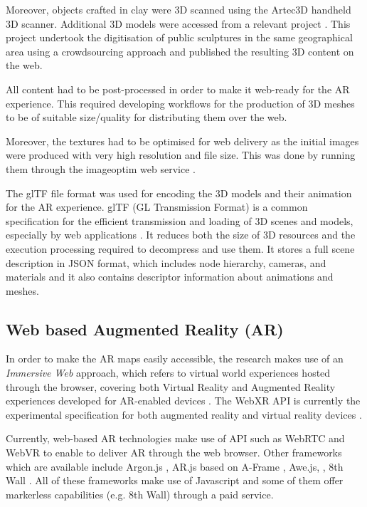 \documentclass[acmlarge,screen,dvipsnames]{acmart}
\begin{document}
Moreover, objects crafted in clay were 3D scanned using the Artec3D handheld
3D scanner. Additional 3D models were accessed from a relevant project
\cite{14f05b94a1844f5e850c87fc9d042c59}. This project undertook the
digitisation of public sculptures in the same geographical area using a
crowdsourcing approach and published the resulting 3D content on the web.

All content had to be post-processed in order to make it web-ready for the AR
experience. This required developing workflows for the production of 3D meshes
to be of suitable size/quality for distributing them over the web. 

Moreover, the textures had to be optimised for web delivery as the initial images were
produced with very high resolution and file size. This was done by running
them through the imageoptim web service \cite{ImageOptim}.  

The glTF file format was used for encoding the 3D models and their animation
for the AR experience. glTF (GL Transmission Format) is a common specification
for the efficient transmission and loading of 3D scenes and models, especially
by web applications \cite{khronos}. It reduces both the size of 3D resources
and the execution processing required to decompress and use them. It stores a
full scene description in JSON format, which includes node hierarchy, cameras,
and materials and it also contains descriptor information about animations and
meshes.


\subsection{Web based Augmented Reality (AR)} %

In order to make the AR maps easily
accessible, the research makes use of an \emph{Immersive Web} approach, which
refers to virtual world experiences hosted through the browser, covering both
Virtual Reality and Augmented Reality experiences developed for AR-enabled
devices \cite{imweb}. The WebXR API is currently the experimental
specification for both augmented reality and virtual reality devices
\cite{webxr}.

Currently, web-based AR technologies make use of API such as WebRTC and WebVR
to enable to deliver AR through the web browser. Other frameworks which are
available include Argon.js \cite{Argon.js}, AR.js based on A-Frame
\cite{aframe}, Awe.js, \cite{Awe.js}, 8th Wall \cite{8th}. All of these
frameworks make use of Javascript and some of them offer markerless
capabilities (e.g. 8th Wall) through a paid service.
\end{document}
